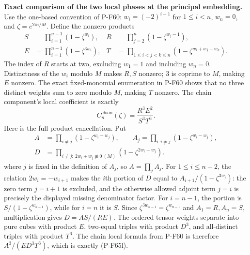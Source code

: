 \par\medskip\noindent\textbf{Exact comparison of the two local phases at the principal embedding.}\quad 
Use the one-based convention of P-F60:
$w_i=(-2)^{i-1}$ for $1\le i<n$, $w_n=0$,
and $\zeta=e^{2\pi i/M}$.  Define the nonzero products
\[
\begin{aligned}
 S&=\prod_{i=1}^{n-1}(1-\zeta^{w_i}),&
 R&=\prod_{j=2}^{n}(1-\zeta^{w_j-1}),\\
 E&=\prod_{i=1}^{n-1}(1-\zeta^{3w_i}),&
 T&=\prod_{1\le i<j<k\le n}(1-\zeta^{w_i+w_j+w_k}).
\end{aligned}                                                  \tag{P-F65k}
\]
The index of $R$ starts at two, excluding $w_1=1$ and including
$w_n=0$.  Distinctness of the $w_i$ modulo $M$ makes $R,S$ nonzero;
$3$ is coprime to $M$, making $E$ nonzero.  The exact fixed-monomial
enumeration in P-F60 shows that no three distinct weights sum to
zero modulo $M$, making $T$ nonzero.
The chain component's local coefficient is exactly
\[
                    C_n^{\mathrm{chain}}(\zeta)
                         =\frac{R^3E^2}{S^3T^6}.       \tag{P-F65l}
\]
Here is the full product cancellation.  Put
\[
\begin{aligned}
 A&=\prod_{i\ne j}(1-\zeta^{w_i-w_j}),\qquad
 A_j=\prod_{i:i\ne j}(1-\zeta^{w_i-w_j}),\\
 D&=\prod_{i\ne j:\ 2w_i+w_j\not\equiv0\ (M)}
                                      (1-\zeta^{2w_i+w_j}).
\end{aligned}
\]
where $j$ is fixed in the definition of $A_j$, so $A=\prod_jA_j$.
For $1\le i\le n-2$, the relation $2w_i=-w_{i+1}$ makes
the $i$th portion of $D$ equal to
$A_{i+1}/(1-\zeta^{3w_i})$: the zero term $j=i+1$ is excluded,
and the otherwise allowed adjoint term $j=i$ is precisely the
displayed missing denominator factor.
For $i=n-1$, the portion is $S/(1-\zeta^{w_{n-1}})$, while
for $i=n$ it is $S$.  Since $\zeta^{3w_{n-1}}=
\zeta^{w_{n-1}}$ and $A_1=R,A_n=S$, multiplication gives
$D=AS/(RE)$.
The ordered tensor weights separate into pure cubes with product
$E$, two-equal triples with product $D^3$, and all-distinct triples
with product $T^6$.  The chain local formula from P-F60 is therefore
$A^3/(ED^3T^6)$, which is exactly (P-F65l).

